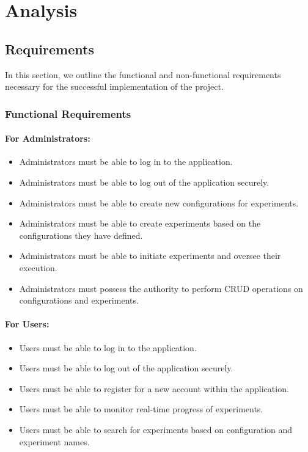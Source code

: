 \chapter{Analysis}

\section{Requirements}

In this section, we outline the functional and non-functional requirements necessary for the successful implementation of the project.

\subsection{Functional Requirements}

\subsubsection{For Administrators:}

\begin{itemize}
    \item Administrators must be able to log in to the application.
    \item Administrators must be able to log out of the application securely.
    \item Administrators must be able to create new configurations for experiments.
    \item Administrators must be able to create experiments based on the configurations they have defined.
    \item Administrators must be able to initiate experiments and oversee their execution.
    \item Administrators must possess the authority to perform CRUD operations on configurations and experiments.
\end{itemize}

\subsubsection{For Users:}

\begin{itemize}
    \item Users must be able to log in to the application.
    \item Users must be able to log out of the application securely.
    \item Users must be able to register for a new account within the application.
    \item Users must be able to monitor real-time progress of experiments.
    \item Users must be able to search for experiments based on configuration and experiment names.
\end{itemize}

